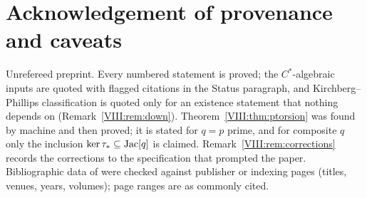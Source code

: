 \section*{Acknowledgement of provenance and caveats}

Unrefereed preprint. Every numbered statement is proved; the $C^*$-algebraic inputs are
quoted with flagged citations in the Status paragraph, and Kirchberg--Phillips
classification is quoted only for an existence statement that nothing depends on
(Remark~\ref{VIII:rem:down}). Theorem~\ref{VIII:thm:ptorsion} was found by machine and then proved;
it is stated for $q=p$ prime, and for composite $q$ only the inclusion
$\ker\tau_*\subseteq\operatorname{Jac}[q]$ is claimed. Remark~\ref{VIII:rem:corrections} records the
corrections to the specification that prompted the paper. Bibliographic data of
\cite{R,Ph,Ro,RS} were checked against publisher or indexing pages (titles, venues,
years, volumes); page ranges are as commonly cited.
